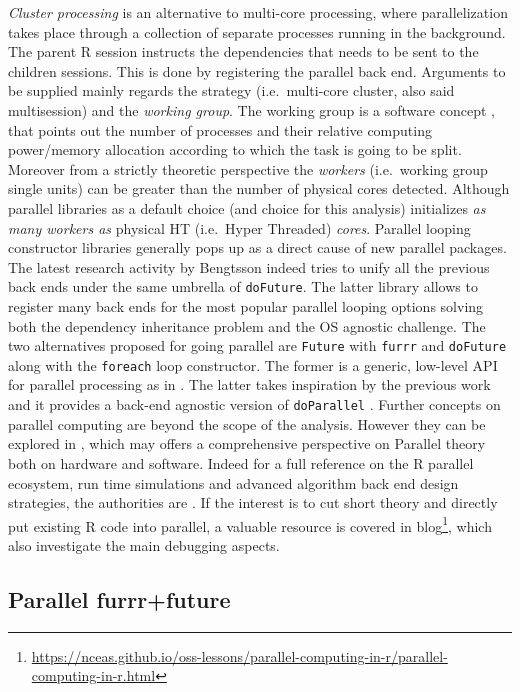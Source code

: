 \documentclass[
  12pt,
  a4paper,
  oneside]{book}
\DeclareRobustCommand{\href}[2]{#2\footnote{\url{#1}}}
\theoremstyle{definition}
\theoremstyle{definition}
\theoremstyle{definition}
\theoremstyle{remark}
\begin{document}
\emph{Cluster processing} is an alternative to multi-core processing, where parallelization takes place through a collection of separate processes running in the background. The parent R session instructs the dependencies that needs to be sent to the children sessions.
This is done by registering the parallel back end. Arguments to be supplied mainly regards the strategy (i.e.~multi-core cluster, also said multisession) and the \emph{working group}. The working group is a software concept \citep{parallelr}, that points out the number of processes and their relative computing power/memory allocation according to which the task is going to be split. Moreover from a strictly theoretic perspective the \emph{workers} (i.e.~working group single units) can be greater than the number of physical cores detected. Although parallel libraries as a default choice (and choice for this analysis) initializes \emph{as many workers as} physical HT (i.e.~Hyper Threaded) \emph{cores}.
Parallel looping constructor libraries generally pops up as a direct cause of new parallel packages. The latest research activity by Bengtsson \citet{doFuture} indeed tries to unify all the previous back ends under the same umbrella of \texttt{doFuture}. The latter library allows to register many back ends for the most popular parallel looping options solving both the dependency inheritance problem and the OS agnostic challenge.
The two alternatives proposed for going parallel are \texttt{Future} \citet{future} with \texttt{furrr} \citet{furrr} and \texttt{doFuture} \citeyearpar{doFuture} along with the \texttt{foreach} \citet{foreach} loop constructor. The former is a generic, low-level API for parallel processing as in \citet{bengtsson_2017}. The latter takes inspiration by the previous work and it provides a back-end agnostic version of \texttt{doParallel} \citet{doParallel}.
Further concepts on parallel computing are beyond the scope of the analysis. However they can be explored in \citet{barney}, which may offers a comprehensive perspective on Parallel theory both on hardware and software. Indeed for a full reference on the R parallel ecosystem, run time simulations and advanced algorithm back end design strategies, the authorities are \citet{parallelr}. If the interest is to cut short theory and directly put existing R code into parallel, a valuable resource is covered in \href{https://nceas.github.io/oss-lessons/parallel-computing-in-r/parallel-computing-in-r.html}{blog}, which also investigate the main debugging aspects.

\hypertarget{parallel-furrrfuture}{%
\subsection{Parallel furrr+future}\label{parallel-furrrfuture}}
\end{document}
